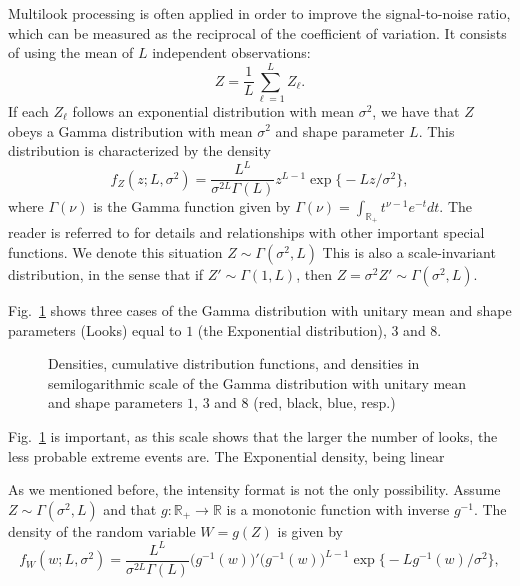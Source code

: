 Multilook processing is often applied in order to improve the signal-to-noise ratio, which can be measured as the reciprocal of the coefficient of variation.
It consists of using the mean of $L$ independent observations:
\begin{equation}
Z = \frac1L \sum_{\ell=1}^{L} Z_\ell.
\end{equation}
If each $Z_\ell$ follows an exponential distribution with mean $\sigma^2$, we have that $Z$ obeys a Gamma distribution with mean $\sigma^2$ and shape parameter $L$.
This distribution is characterized by the density
\begin{equation}
f_Z(z;L,\sigma^2) = \frac{L^L}{\sigma^{2L}\Gamma(L)} z^{L-1} 
	\exp\big\{ -L z / \sigma^2
	\big\},
\end{equation}
where $\Gamma(\nu)$ is the Gamma function given by $\Gamma(\nu)=\int_{\mathbb R_+} t^{\nu-1} e^{-t} dt$.
The reader is referred to \citet{abramo-stegu64} for details and relationships with other important special functions.
We denote this situation $Z\sim\Gamma(\sigma^2,L)$
This is also a scale-invariant distribution, in the sense that if $Z'\sim\Gamma(1,L)$, then $Z=\sigma^2 Z'\sim \Gamma(\sigma^2,L)$.

Fig.~\ref{Fig:GammaDistribution} shows three cases of the Gamma distribution with unitary mean and shape parameters (Looks) equal to $1$ (the Exponential distribution), $3$ and $8$.

\begin{figure}[hbt]
\centering
{}
\caption[Densities, cumulative distribution functions, and densities in semilogarithmic scale of the Gamma distribution with unitary mean and shape parameters $1$, $3$ and $8$]{Densities, cumulative distribution functions, and densities in semilogarithmic scale of the Gamma distribution with unitary mean and shape parameters $1$, $3$ and $8$ (red, black, blue, resp.)}\label{Fig:GammaDistribution}
\end{figure}

Fig.~\ref{Fig:GammaDistribution} is important, as this scale shows that the larger the number of looks, the less probable extreme events are.
The Exponential density, being linear

As we mentioned before, the intensity format is not the only possibility.
Assume $Z\sim\Gamma(\sigma^2,L)$ and that $g\colon\mathbb R_+ \to \mathbb R$ is a monotonic function with inverse $g^{-1}$.
The density of the random variable $W = g(Z)$ is given by 
\begin{equation}
f_W(w;L,\sigma^2) = \frac{L^L}{\sigma^{2L}\Gamma(L)} (g^{-1}(w)\big)' \big(g^{-1}(w)\big)^{L-1} 
	\exp\big\{ -L g^{-1}(w) / \sigma^2
	\big\},
	\label{eq:GammmaTransformed}
\end{equation}

